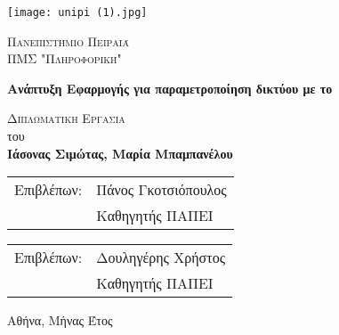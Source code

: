 \begin{titlepage}
    \begin{center}
        \vspace*{-1cm}
        
        \texttt{[image: unipi (1).jpg]}
        
        \Large
        \textsc{Πανεπιστήμιο Πειραιά}\\
        \large
        \textsc{ΠΜΣ "Πληροφορική"}\\
        
        \vspace{2.5cm}
        
        \Huge
        \textbf{Ανάπτυξη Εφαρμογής για παραμετροποίηση δικτύου με το }
        
        \vspace{3cm}
        \Large
        \textsc{Διπλωματικη Εργασια}\\
        του\\

        \LARGE
        \textbf{Ιάσονας Σιμώτας, Μαρία Μπαμπανέλου}
        
    \end{center}
    
    \vspace{3cm}
    
    \begin{tabular}{ll}
		Επιβλέπων: & Πάνος Γκοτσιόπουλος \\
		 & Καθηγητής ΠΑΠΕΙ
	\end{tabular}

    \begin{tabular}{ll}
		Επιβλέπων: & Δουληγέρης Χρήστος \\
		 & Καθηγητής ΠΑΠΕΙ
	\end{tabular}
	
    \vfill
    
    \begin{center}
    	 Αθήνα, Μήνας Έτος	
    \end{center}
\end{titlepage}